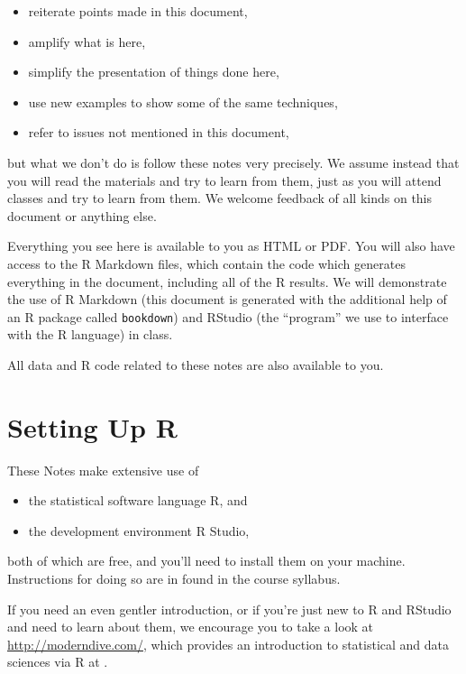 \documentclass[
]{book}
\providecommand{\tightlist}{%
  \setlength{\itemsep}{0pt}\setlength{\parskip}{0pt}}
\begin{document}
\begin{itemize}
\tightlist
\item
  reiterate points made in this document,
\item
  amplify what is here,
\item
  simplify the presentation of things done here,
\item
  use new examples to show some of the same techniques,
\item
  refer to issues not mentioned in this document,
\end{itemize}

but what we don't do is follow these notes very precisely. We assume instead that you will read the materials and try to learn from them, just as you will attend classes and try to learn from them. We welcome feedback of all kinds on this document or anything else.

Everything you see here is available to you as HTML or PDF. You will also have access to the R Markdown files, which contain the code which generates everything in the document, including all of the R results. We will demonstrate the use of R Markdown (this document is generated with the additional help of an R package called \texttt{bookdown}) and RStudio (the ``program'' we use to interface with the R language) in class.

All data and R code related to these notes are also available to you.

\hypertarget{setting-up-r}{%
\section*{Setting Up R}\label{setting-up-r}}

These Notes make extensive use of

\begin{itemize}
\tightlist
\item
  the statistical software language R, and
\item
  the development environment R Studio,
\end{itemize}

both of which are free, and you'll need to install them on your machine. Instructions for doing so are in found in the course syllabus.

If you need an even gentler introduction, or if you're just new to R and RStudio and need to learn about them, we encourage you to take a look at \url{http://moderndive.com/}, which provides an introduction to statistical and data sciences via R at \citet{ModernDive}.
\end{document}
